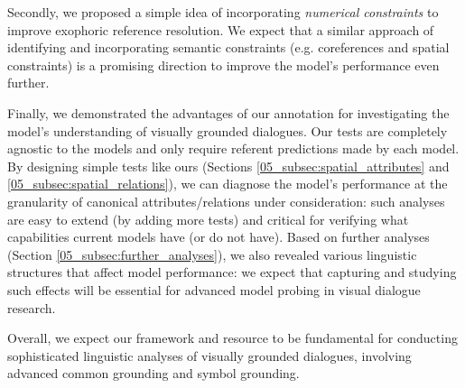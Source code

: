 Secondly, we proposed a simple idea of incorporating \textit{numerical constraints} to improve exophoric reference resolution. We expect that a similar approach of identifying and incorporating semantic constraints (e.g. coreferences and spatial constraints) is a promising direction to improve the model's performance even further.

Finally, we demonstrated the advantages of our annotation for investigating the model's understanding of visually grounded dialogues. Our tests are completely agnostic to the models and only require referent predictions made by each model. By designing simple tests like ours (Sections \ref{05_subsec:spatial_attributes} and \ref{05_subsec:spatial_relations}), we can diagnose the model's performance at the granularity of canonical attributes/relations under consideration: such analyses are easy to extend (by adding more tests) and critical for verifying what capabilities current models have (or do not have). Based on further analyses (Section \ref{05_subsec:further_analyses}), we also revealed various linguistic structures that affect model performance: we expect that capturing and studying such effects will be essential for advanced model probing in visual dialogue research.

Overall, we expect our framework and resource to be fundamental for conducting sophisticated linguistic analyses of visually grounded dialogues, involving advanced common grounding and symbol grounding.
